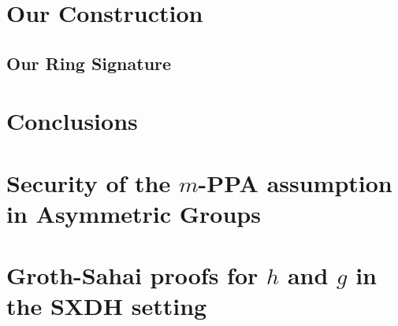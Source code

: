 \documentclass{llncs}
\begin{document}
		

	
	
	\section{Our Construction} \label{sec:high-level}
        
        		
    	
	\subsection{Our Ring Signature}\label{sec:our-construction}
        	 
	

	\section{Conclusions}

		





\appendix

	\section{Security of the $m$-PPA assumption in Asymmetric Groups} \label{sec:aPPA}
	
		
		



	\section{Groth-Sahai proofs for $h$ and $g$ in the SXDH setting}
	
\end{document}
